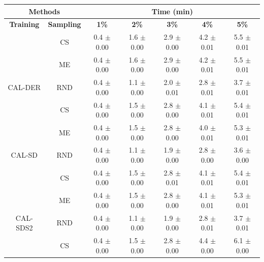 \begin{table}[htbp]
\centering

\begin{tabular*}{\linewidth}{c|c|@{\extracolsep{\fill}}ccccc}
\toprule
\multicolumn{2}{c|}{\textbf{Methods}} & \multicolumn{5}{c}{\textbf{Time (min)}} \\
\midrule
\textbf{Training} & \textbf{Sampling} & \textbf{1\%} & \textbf{2\%} & \textbf{3\%} & \textbf{4\%} & \textbf{5\%}\\
\midrule
 & CS & 0.4 $\pm$ {\small 0.00} & 1.6 $\pm$ {\small 0.00} & 2.9 $\pm$ {\small 0.00} & 4.2 $\pm$ {\small 0.01} & 5.5 $\pm$ {\small 0.01}\\

 & ME & 0.4 $\pm$ {\small 0.00} & 1.6 $\pm$ {\small 0.00} & 2.9 $\pm$ {\small 0.00} & 4.2 $\pm$ {\small 0.01} & 5.5 $\pm$ {\small 0.01}\\

\multirow{-3}{*}{\raggedright\arraybackslash CAL-DER} & RND & 0.4 $\pm$ {\small 0.00} & 1.1 $\pm$ {\small 0.00} & 2.0 $\pm$ {\small 0.01} & 2.8 $\pm$ {\small 0.01} & 3.7 $\pm$ {\small 0.01}\\
\midrule
 & CS & 0.4 $\pm$ {\small 0.00} & 1.5 $\pm$ {\small 0.00} & 2.8 $\pm$ {\small 0.00} & 4.1 $\pm$ {\small 0.01} & 5.4 $\pm$ {\small 0.01}\\

 & ME & 0.4 $\pm$ {\small 0.00} & 1.5 $\pm$ {\small 0.00} & 2.8 $\pm$ {\small 0.00} & 4.0 $\pm$ {\small 0.01} & 5.3 $\pm$ {\small 0.01}\\

\multirow{-3}{*}{\raggedright\arraybackslash CAL-SD} & RND & 0.4 $\pm$ {\small 0.00} & 1.1 $\pm$ {\small 0.00} & 1.9 $\pm$ {\small 0.00} & 2.8 $\pm$ {\small 0.00} & 3.6 $\pm$ {\small 0.00}\\
\midrule
 & CS & 0.4 $\pm$ {\small 0.00} & 1.5 $\pm$ {\small 0.00} & 2.8 $\pm$ {\small 0.01} & 4.1 $\pm$ {\small 0.01} & 5.4 $\pm$ {\small 0.01}\\

 & ME & 0.4 $\pm$ {\small 0.00} & 1.5 $\pm$ {\small 0.00} & 2.8 $\pm$ {\small 0.00} & 4.1 $\pm$ {\small 0.01} & 5.3 $\pm$ {\small 0.01}\\

\multirow{-3}{*}{\raggedright\arraybackslash CAL-SDS2} & RND & 0.4 $\pm$ {\small 0.00} & 1.1 $\pm$ {\small 0.00} & 1.9 $\pm$ {\small 0.00} & 2.8 $\pm$ {\small 0.01} & 3.7 $\pm$ {\small 0.01}\\
\midrule
 & CS & 0.4 $\pm$ {\small 0.00} & 1.5 $\pm$ {\small 0.00} & 2.8 $\pm$ {\small 0.00} & 4.4 $\pm$ {\small 0.00} & 6.1 $\pm$ {\small 0.00}\\


\end{tabular*}
\end{table}
